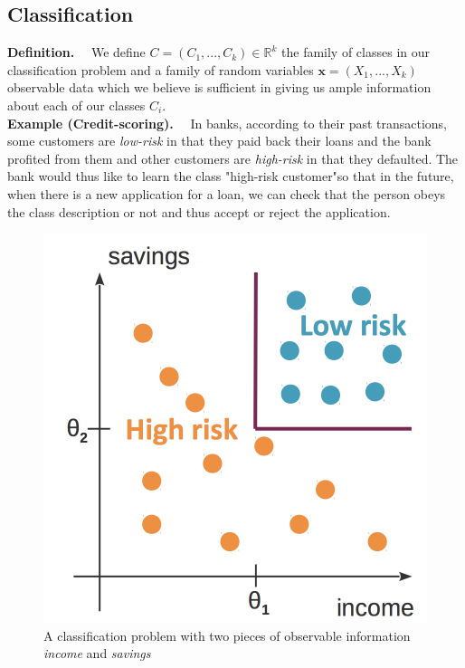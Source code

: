 \documentclass[a4paper,12pt]{article}
\newcommand{\xx}{{\bm x}}
\begin{document}
\subsection{Classification}
\textbf{Definition.}$\quad$ We define $C = (C_1, ..., C_k) \in \mathbb{R}^k $ the family of classes in our classification problem and a family of random variables $\xx = (X_1, ..., X_k)$ observable data which we believe is sufficient in giving us ample information about each of our classes $C_i$.\\

\textbf{Example (Credit-scoring).$\quad$} In banks, according to their past transactions, some customers are \textit{low-risk} in that they paid back their loans and the bank profited from them and other customers are \textit{high-risk} in that they defaulted. The bank would thus like to learn the class "high-risk customer"so that in the future, when there is a new application for a loan, we can check that the person obeys the class description or not and thus accept or reject the application. \\

\pagebreak
\begin{figure}[h]
\centering
\includegraphics[scale=0.3]{creditscoring}
\caption{A classification problem with two pieces of observable information \textit{income} and \textit{savings}}
    \label{fig:creditscoring}
\end{figure}
\end{document}
